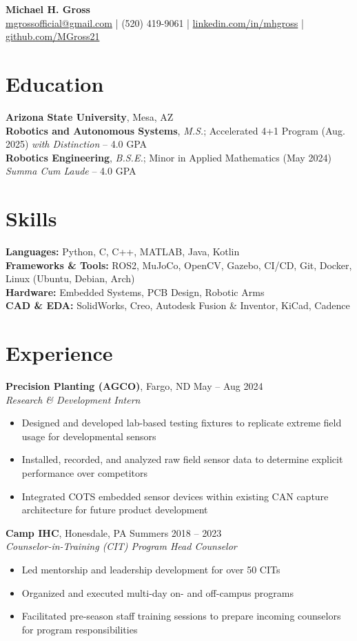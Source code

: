 \documentclass[10pt]{article}
\begin{document}
\begin{center}
    {\LARGE \textbf{Michael H. Gross}} \\
    \href{mailto:mgrossofficial@gmail.com}{mgrossofficial@gmail.com} | (520) 419-9061 | 
    \href{https://www.linkedin.com/in/mhgross}{linkedin.com/in/mhgross} | \href{https://github.com/MGross21}{github.com/MGross21}
\end{center}

\section*{Education}
\textbf{Arizona State University}, Mesa, AZ \\
\textbf{Robotics and Autonomous Systems}, \textit{M.S.}; Accelerated 4+1 Program (Aug. 2025) \hfill \textit{with Distinction} -- 4.0 GPA \\
\textbf{Robotics Engineering}, \textit{B.S.E.}; Minor in Applied Mathematics (May 2024) \hfill \textit{Summa Cum Laude} -- 4.0 GPA

\section*{Skills}
\textbf{Languages:} Python, C, C++, MATLAB, Java, Kotlin \\
\textbf{Frameworks \& Tools:} ROS2, MuJoCo, OpenCV, Gazebo, CI/CD, Git, Docker, Linux (Ubuntu, Debian, Arch) \\
\textbf{Hardware:} Embedded Systems, PCB Design, Robotic Arms \\
\textbf{CAD \& EDA:} SolidWorks, Creo, Autodesk Fusion \& Inventor, KiCad, Cadence

\section*{Experience}
\textbf{Precision Planting (AGCO)}, Fargo, ND \hfill May -- Aug 2024 \\
\textit{Research \& Development Intern}
\begin{itemize}
  \item Designed and developed lab-based testing fixtures to replicate extreme field usage for developmental sensors
  \item Installed, recorded, and analyzed raw field sensor data to determine explicit performance over competitors
  \item Integrated COTS embedded sensor devices within existing CAN capture architecture for future product development
\end{itemize}
\vspace{0.5em}
\textbf{Camp IHC}, Honesdale, PA \hfill Summers 2018 -- 2023 \\
\textit{Counselor-in-Training (CIT) Program Head Counselor}
\begin{itemize}
  \item Led mentorship and leadership development for over 50 CITs
  \item Organized and executed multi-day on- and off-campus programs
  \item Facilitated pre-season staff training sessions to prepare incoming counselors for program responsibilities
\end{itemize}
\end{document}
